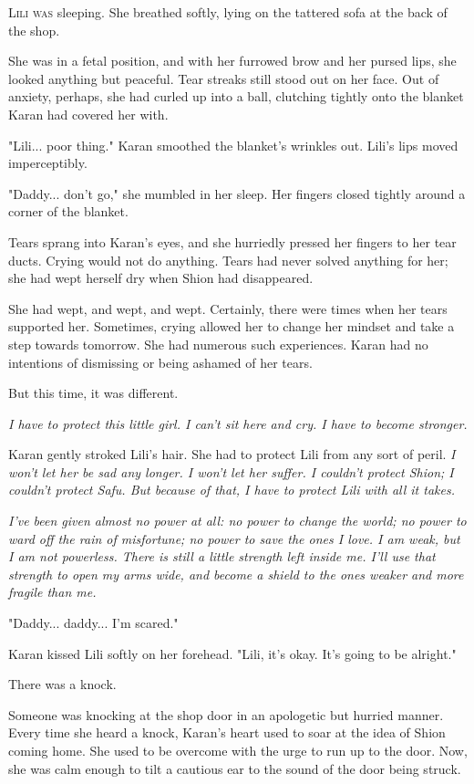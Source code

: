 \lettrine{L}{ili was} sleeping. She breathed softly, lying on the tattered sofa at
the back of the shop.

She was in a fetal position, and with her furrowed brow and her pursed
lips, she looked anything but peaceful. Tear streaks still stood out on
her face. Out of anxiety, perhaps, she had curled up into a ball,
clutching tightly onto the blanket Karan had covered her with.

"Lili... poor thing." Karan smoothed the blanket's wrinkles out. Lili's
lips moved imperceptibly.

"Daddy... don't go," she mumbled in her sleep. Her fingers closed
tightly around a corner of the blanket.

Tears sprang into Karan's eyes, and she hurriedly pressed her fingers to
her tear ducts. Crying would not do anything. Tears had never solved
anything for her; she had wept herself dry when Shion had disappeared.

She had wept, and wept, and wept. Certainly, there were times when her
tears supported her. Sometimes, crying allowed her to change her mindset
and take a step towards tomorrow. She had numerous such experiences.
Karan had no intentions of dismissing or being ashamed of her tears.

But this time, it was different.

\emph{I have to protect this little girl. I can't sit here and cry. I have to
	become stronger.}

Karan gently stroked Lili's hair. She had to protect Lili from any sort
of peril. \emph{I won't let her be sad any longer. I won't let her suffer. I
	couldn't protect Shion; I couldn't protect Safu. But because of that, I
	have to protect Lili with all it takes.}

\emph{I've been given almost no power at all: no power to change the world; no
	power to ward off the rain of misfortune; no power to save the ones I
	love. I am weak, but I am not powerless. There is still a little
	strength left inside me. I'll use that strength to open my arms wide,
	and become a shield to the ones weaker and more fragile than me.}

"Daddy... daddy... I'm scared."

Karan kissed Lili softly on her forehead. "Lili, it's okay. It's going
to be alright."

There was a knock.

Someone was knocking at the shop door in an apologetic but hurried
manner. Every time she heard a knock, Karan's heart used to soar at the
idea of Shion coming home. She used to be overcome with the urge to run
up to the door. Now, she was calm enough to tilt a cautious ear to the
sound of the door being struck.

